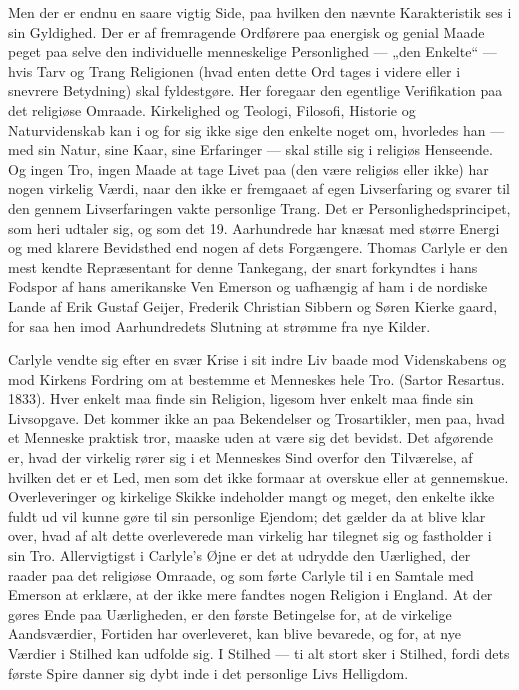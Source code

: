 \documentclass[12pt,a4paper,openany]{book}
\newcommand{\opage}[1]{\marginnote{\footnotesize\textit{[#1]}}}
\begin{document}
Men der er endnu en saare vigtig Side, paa hvilken den nævnte
Karakteristik ses i sin Gyldighed. Der er af fremragende Ordførere
paa energisk og genial Maade peget paa selve den individuelle menneskelige
Personlighed --- „den Enkelte“ --- hvis Tarv og Trang Religionen
(hvad enten dette Ord tages i videre eller i snevrere Betydning)
skal fyldestgøre. Her foregaar den egentlige Verifikation paa
det religiøse Omraade. Kirkelighed og Teologi, Filosofi, Historie og
Naturvidenskab kan i og for sig ikke sige den enkelte noget om,
hvorledes han --- med sin Natur, sine Kaar, sine Erfaringer --- skal
stille sig i religiøs Henseende. Og ingen Tro, ingen Maade at tage
Livet paa (den være religiøs eller ikke) har nogen virkelig Værdi,
naar den ikke er fremgaaet af egen Livserfaring og svarer til den
gennem Livserfaringen vakte personlige Trang. Det er Personlighedsprincipet,
som heri udtaler sig, og som det 19. Aarhundrede har
knæsat med større Energi og med klarere Bevidsthed end nogen af
dets Forgængere. Thomas Carlyle er den mest kendte Repræsentant
for denne Tankegang, der snart forkyndtes i hans Fodspor af hans
amerikanske Ven Emerson og uafhængig af ham i de nordiske Lande
af Erik Gustaf Geijer, Frederik Christian Sibbern og Søren Kierke%
\opage{138}gaard, for saa hen imod Aarhundredets Slutning at strømme fra nye
Kilder.

Carlyle vendte sig efter en svær Krise i sit indre Liv baade mod
Videnskabens og mod Kirkens Fordring om at bestemme et Menneskes
hele Tro. (Sartor Resartus. 1833). Hver enkelt maa finde sin
Religion, ligesom hver enkelt maa finde sin Livsopgave. Det kommer
ikke an paa Bekendelser og Trosartikler, men paa, hvad et Menneske
praktisk tror, maaske uden at være sig det bevidst. Det afgørende er,
hvad der virkelig rører sig i et Menneskes Sind overfor den Tilværelse,
af hvilken det er et Led, men som det ikke formaar at overskue
eller at gennemskue. Overleveringer og kirkelige Skikke indeholder
mangt og meget, den enkelte ikke fuldt ud vil kunne gøre
til sin personlige Ejendom; det gælder da at blive klar over, hvad af
alt dette overleverede man virkelig har tilegnet sig og fastholder i
sin Tro. Allervigtigst i Carlyle’s Øjne er det at udrydde den Uærlighed,
der raader paa det religiøse Omraade, og som førte Carlyle til
i en Samtale med Emerson at erklære, at der ikke mere fandtes nogen
Religion i England. At der gøres Ende paa Uærligheden, er den
første Betingelse for, at de virkelige Aandsværdier, Fortiden har overleveret,
kan blive bevarede, og for, at nye Værdier i Stilhed kan udfolde
sig. I Stilhed --- ti alt stort sker i Stilhed, fordi dets første Spire
danner sig dybt inde i det personlige Livs Helligdom.
\end{document}
